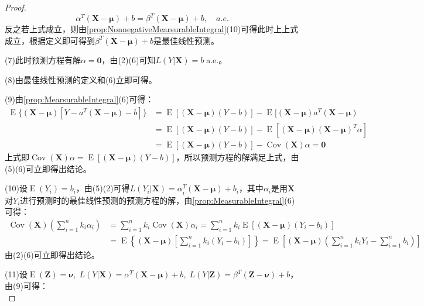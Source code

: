 \begin{proof}
	\begin{equation*}
		\alpha^T(\mathbf{X}-\boldsymbol{\mu})+b=\beta^T(\mathbf{X}-\boldsymbol{\mu})+b,\quad a.e.
	\end{equation*}
	反之若上式成立，则由\cref{prop:NonnegativeMearsurableIntegral}(10)可得此时上上式成立，根据定义即可得到$\beta^T(\mathbf{X}-\boldsymbol{\mu})+b$是最佳线性预测。\par
	(7)此时预测方程有解$\alpha=\mathbf{0}$，由(2)(6)可知$L(Y|\mathbf{X})=b\;$a.e.。\par
	(8)由最佳线性预测的定义和(6)立即可得。\par
	(9)由\cref{prop:MearsurableIntegral}(6)可得：
	\begin{align*}
		\operatorname{E}\{(\mathbf{X}-\boldsymbol{\mu})[Y-a^T(\mathbf{X}-\boldsymbol{\mu})-b]\}&=\operatorname{E}[(\mathbf{X}-\boldsymbol{\mu})(Y-b)]-\operatorname{E}[(\mathbf{X}-\boldsymbol{\mu})a^T(\mathbf{X}-\boldsymbol{\mu}) \\
		&=\operatorname{E}[(\mathbf{X}-\boldsymbol{\mu})(Y-b)]-\operatorname{E}[(\mathbf{X}-\boldsymbol{\mu})(\mathbf{X}-\boldsymbol{\mu})^T\alpha] \\
		&=\operatorname{E}[(\mathbf{X}-\boldsymbol{\mu})(Y-b)]-\operatorname{Cov}(\mathbf{X})\alpha=\mathbf{0}
	\end{align*}
	上式即$\operatorname{Cov}(\mathbf{X})\alpha=\operatorname{E}[(\mathbf{X}-\boldsymbol{\mu})(Y-b)]$，所以预测方程的解满足上式，由(5)(6)可立即得出结论。\par
	(10)设$\operatorname{E}(Y_i)=b_i$，由(5)(2)可得$L(Y_i|\mathbf{X})=\alpha_i^T(\mathbf{X}-\boldsymbol{\mu})+b_i$，其中$\alpha_i$是用$\mathbf{X}$对$Y_i$进行预测时的最佳线性预测的预测方程的解，由\cref{prop:MeasurableIntegral}(6)可得：
	\begin{align*}
		\operatorname{Cov}(\mathbf{X})\left(\sum_{i=1}^{n}k_i\alpha_i\right)&=\sum_{i=1}^{n}k_i\operatorname{Cov}(\mathbf{X})\alpha_i=\sum_{i=1}^{n}k_i\operatorname{E}[(\mathbf{X}-\boldsymbol{\mu})(Y_i-b_i)] \\
		&=\operatorname{E}\left\{(\mathbf{X}-\boldsymbol{\mu})\left[\sum_{i=1}^{n}k_i(Y_i-b_i)\right]\right\} =\operatorname{E}\left[(\mathbf{X}-\boldsymbol{\mu})\left(\sum_{i=1}^{n}k_iY_i-\sum_{i=1}^{n}b_i\right)\right]
	\end{align*}
	由(2)(6)可立即得出结论。\par
	(11)设$\operatorname{E}(\mathbf{Z})=\boldsymbol{\nu},\;L(Y|\mathbf{X})=\alpha^T(\mathbf{X}-\boldsymbol{\mu})+b,\;L(Y|\mathbf{Z})=\beta^T(\mathbf{Z}-\boldsymbol{\nu})+b$，由(9)可得：
	\begin{equation*}

\end{equation*}
\end{proof}

